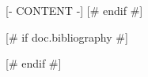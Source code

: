 \documentclass[letterpaper,11pt]{article}
[# else #]
\begin{document}
\hypersetup{pageanchor=true}
\tableofcontents

[- CONTENT -]
[# endif #]

[# if doc.bibliography #]

[# endif #]
\end{document}
